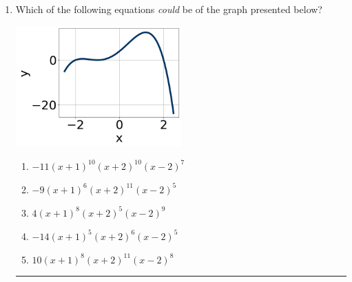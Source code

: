 \documentclass[14pt]{extbook}
\newcommand{\litem}[1]{\item#1\hspace*{-1cm}\rule{\textwidth}{0.4pt}}
\begin{document}
\begin{enumerate}
{\begin{enumerate}[label=\Alph*.]
\end{enumerate} }
\litem{
Which of the following equations \textit{could} be of the graph presented below?
\begin{center}
    \includegraphics[width=0.5\textwidth]{../Figures/polyGraphToFunctionB.png}
\end{center}
\begin{enumerate}[label=\Alph*.]
\item \( -11(x + 1)^{10} (x + 2)^{10} (x - 2)^{7} \)
\item \( -9(x + 1)^{6} (x + 2)^{11} (x - 2)^{5} \)
\item \( 4(x + 1)^{8} (x + 2)^{5} (x - 2)^{9} \)
\item \( -14(x + 1)^{5} (x + 2)^{6} (x - 2)^{5} \)
\item \( 10(x + 1)^{8} (x + 2)^{11} (x - 2)^{8} \)


\end{enumerate}}
\end{enumerate}
\end{document}
